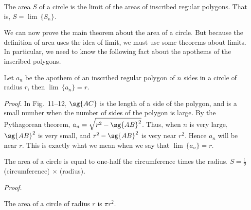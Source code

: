 \documentclass[11pt]{book}
\theoremstyle{bkplain}
\theoremstyle{XIplainnote}
\theoremstyle{bkplain}
\theoremstyle{bkplain}
\begin{document}
\begin{definition}
The area $S$ of a circle is the limit of the areas of inscribed regular
polygons. That is, $S = \lim\,\{S_n\}$.
\end{definition}

We can now prove the main theorem about the area of a circle. But because the
definition of area uses the idea of limit, we must use some theorems about
limits. In particular, we need to know the following fact about the apothems of
the inscribed polygons.

\begin{theorem}
Let $a_n$ be the apothem of an inscribed regular polygon of $n$ sides in a
circle of radius $r$, then $\lim\,\{a_n\} = r$.
\end{theorem}

\FIGXITWELVE

\noindent\emph{Proof.} In Fig.~11--12, $\sg{AC}$ is the length of a side of the
polygon, and is a small number when the number of sides of the polygon is
large. By the Pythagorean theorem, $a_n = \sqrt{r^2 - \sg{AB}^2}$. Thus, when
$n$ is very large, $\sg{AB}^2$ is very small, and $r^2 - \sg{AB}^2$ is very
near $r^2$. Hence $a_n$ will be near $r$. This is exactly what we mean when we
say that $\lim\,\{a_n\} = r$.

\begin{theorem}
The area of a circle is equal to one-half the circumference times the radius.
$S = \frac{1}{2}$ (circumference) $\times$ (radius).
\end{theorem}

\noindent\emph{Proof.}
\begin{steps}
\end{steps}

\begin{corollary}
The area of a circle of radius $r$ is $\pi r^2$.
\end{corollary}
\end{document}
